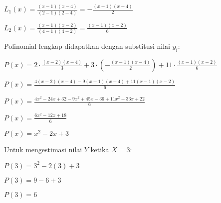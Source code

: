 \documentclass[a4paper]{article}
\begin{document}
\begin{enumerate}[itemsep=1em,leftmargin=*]
  \(L_1(x) = \frac{(x - 1)(x - 4)}{(2 - 1)(2 - 4)} = -\frac{(x - 1)(x - 4)}{2}\)

  \(L_2(x) = \frac{(x - 1)(x - 2)}{(4 - 1)(4 - 2)} = \frac{(x - 1)(x - 2)}{6}\)

  Polinomial lengkap didapatkan dengan substitusi nilai \(y_i\):

  \(P(x) = 2 \cdot \frac{(x - 2)(x - 4)}{3} + 3 \cdot \left(-\frac{(x - 1)(x - 4)}{2}\right) + 11 \cdot \frac{(x - 1)(x - 2)}{6}\)

  \(P(x) = \frac{4(x - 2)(x - 4)- 9(x - 1)(x - 4) + 11(x - 1)(x - 2)}{6}\)

  \(P(x) = \frac{4x^2 - 24x + 32 - 9x^2 + 45x - 36 + 11x^2 - 33x + 22}{6}\)

  \(P(x) = \frac{6x^2 - 12x + 18}{6}\)

  \(P(x) = x^2 - 2x + 3\)

  Untuk mengestimasi nilai \(Y\) ketika \(X = 3\):

  \(P(3) = 3^2 - 2(3) + 3\)

  \(P(3) = 9 - 6 + 3\)

  \(P(3) = 6\)

\end{enumerate}
\end{document}
